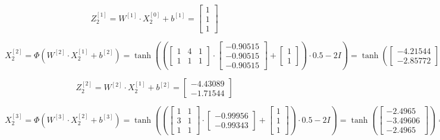 \documentclass{article}
\begin{document}
\[ Z^{[1]}_2 = W^{[1]} \cdot X^{[0]}_2 + b^{[1]} = \begin{bmatrix} 1 \\ 1 \\ 1 \end{bmatrix} \]

\[ X^{[2]}_2 = \Phi(W^{[2]} \cdot X^{[1]}_2 + b^{[2]}) = \tanh \left( \left(\begin{bmatrix} 1 & 4 & 1 \\ 1 & 1 & 1 \end{bmatrix} \cdot \begin{bmatrix} -0.90515 \\ -0.90515 \\ -0.90515 \end{bmatrix} + \begin{bmatrix} 1 \\ 1 \end{bmatrix} \right) \cdot 0.5 - 2I \right) = \tanh \left( \begin{bmatrix} -4.21544 \\ -2.85772 \end{bmatrix} \right)  = \begin{bmatrix} -0.99956 \\ -0.99343 \end{bmatrix} \]

\[ Z^{[2]}_2 = W^{[2]} \cdot X^{[1]}_2 + b^{[2]} = \begin{bmatrix} -4.43089 \\ -1.71544 \end{bmatrix} \]

\[ X^{[3]}_2 = \Phi(W^{[3]} \cdot X^{[2]}_2 + b^{[3]}) = \tanh \left( \left(\begin{bmatrix} 1 & 1  \\ 3 & 1 \\ 1 & 1 \end{bmatrix} \cdot \begin{bmatrix} -0.99956 \\ -0.99343 \end{bmatrix} + \begin{bmatrix} 1 \\ 1 \\ 1 \end{bmatrix} \right) \cdot 0.5 - 2I \right) = \tanh \left( \begin{bmatrix} -2.4965 \\ -3.49606 \\ -2.4965 \end{bmatrix} \right)  = \begin{bmatrix} -0.98652 \\ -0.99816 \\ -0.98652 \end{bmatrix} \]
\end{document}

